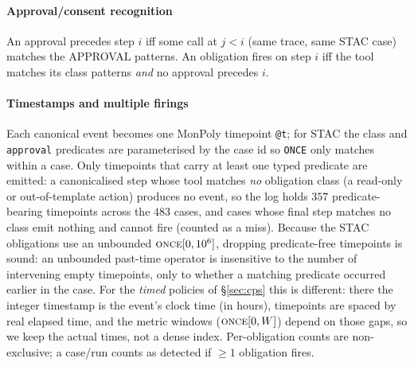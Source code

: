 \documentclass[sigconf]{acmart}
\begin{document}
\paragraph{Approval/consent recognition} An approval precedes step $i$ iff some call
at $j<i$ (same trace, same STAC case) matches the APPROVAL patterns. An obligation
fires on step $i$ iff the tool matches its class patterns \emph{and} no approval
precedes $i$.

\paragraph{Timestamps and multiple firings} Each canonical event becomes one MonPoly
timepoint \texttt{@t}; for STAC the class and \texttt{approval} predicates are
parameterised by the case id so \texttt{ONCE} only matches within a case. Only
timepoints that carry at least one typed predicate are emitted: a canonicalised step
whose tool matches \emph{no} obligation class (a read-only or out-of-template action)
produces no event, so the log holds $357$ predicate-bearing timepoints across the
$483$ cases, and cases whose final step matches no class emit nothing and cannot fire
(counted as a miss). Because the STAC obligations use an unbounded
$\text{\textsc{once}}[0,10^6]$, dropping predicate-free timepoints is sound: an
unbounded past-time operator is insensitive to the number of intervening empty
timepoints, only to whether a matching predicate occurred earlier in the case. For the
\emph{timed} policies of \S\ref{sec:cps} this is different: there the integer
timestamp is the event's clock time (in hours), timepoints are spaced by real elapsed
time, and the metric windows ($\text{\textsc{once}}[0,W]$) depend on those gaps, so we
keep the actual times, not a dense index. Per-obligation counts are
non-exclusive; a case/run counts as detected if $\ge 1$ obligation fires.
\end{document}

